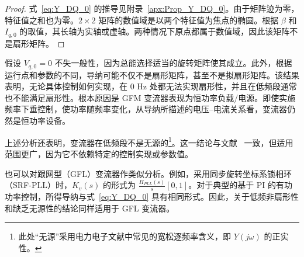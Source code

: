 \begin{proof}
式~\eqref{eq:Y_DQ_0} 的推导见附录~\ref{apx:Prop_Y_DQ_0}。由于矩阵迹为零，特征值之和也为零。$2\times2$ 矩阵的数值域是以两个特征值为焦点的椭圆。根据 $\beta$ 和 $I_{q,0}$ 的取值，其长轴为实轴或虚轴。两种情况下原点都属于数值域，因此该矩阵不是扇形矩阵。
\end{proof}

假设 $V_{q,0}=0$ 不失一般性，因为总能选择适当的旋转矩阵使其成立。此外，根据运行点和参数的不同，导纳可能不仅不是扇形矩阵，甚至不是拟扇形矩阵。该结果表明，无论具体控制如何实现，在 $0$ Hz 处都无法实现扇形性，并且在低频段通常也不能满足扇形性。根本原因是 GFM 变流器表现为恒功率负载/电源。即使实施频率下垂控制，使功率随频率变化，从导纳所描述的电压--电流关系看，变流器仍然是恒功率设备。

上述分析还表明，变流器在低频段不是无源的\footnote{此处“无源”采用电力电子文献中常见的宽松逐频率含义，即 $Y(j\omega)$ 的正实性。}。这一结论与文献~\cite{deyAnalysisPassivityCharacteristics2021} 一致，但适用范围更广，因为它不依赖特定的控制实现或参数值。

\begin{rem}
也可以对跟网型（GFL）变流器作类似分析。例如，采用同步旋转坐标系锁相环（SRF-PLL）时，$K_v(s)$ 的形式为 $\frac{H_{PLL}(s)}{s}[0,1]$。对于典型的基于 PI 的有功功率控制，所得导纳与式~\eqref{eq:Y_DQ_0} 具有相同形式。因此，关于低频非扇形性和缺乏无源性的结论同样适用于 GFL 变流器。
\end{rem}
